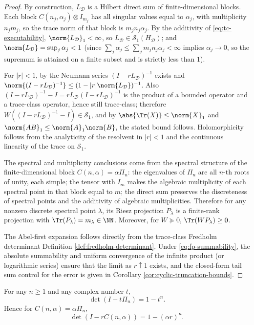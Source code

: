 \begin{proof}
By construction, \(L_{\mathcal D}\) is a Hilbert direct sum of finite-dimensional blocks.
Each block \(C(n_j,\alpha_j)\otimes I_{m_j}\) has all singular values equal to \(\alpha_j\), with multiplicity \(n_jm_j\), so the trace norm of that block is \(m_jn_j\alpha_j\).
By the additivity of \eqref{eq:tc-executability}, \(\norm{L_{\mathcal D}}_1<\infty\), so \(L_{\mathcal D}\in\mathcal{S}_1(H_{\mathcal D})\); and \(\norm{L_{\mathcal D}}=\sup_j\alpha_j<1\) (since \(\sum_j\alpha_j\le\sum_j m_jn_j\alpha_j<\infty\) implies \(\alpha_j\to 0\), so the supremum is attained on a finite subset and is strictly less than \(1\)).

For \(|r|<1\), by the Neumann series \((I-rL_{\mathcal D})^{-1}\) exists and
\(
\norm{(I-rL_{\mathcal D})^{-1}}\le (1-|r|\norm{L_{\mathcal D}})^{-1}
\).
Also \((I-rL_{\mathcal D})^{-1}-I=rL_{\mathcal D}(I-rL_{\mathcal D})^{-1}\) is the product of a bounded operator and a trace-class operator, hence still trace-class; therefore \(W((I-rL_{\mathcal D})^{-1}-I)\in\mathcal{S}_1\), and by \(\abs{\Tr(X)}\le \norm{X}_1\) and \(\norm{AB}_1\le \norm{A}_1\norm{B}\), the stated bound follows.
Holomorphicity follows from the analyticity of the resolvent in \(|r|<1\) and the continuous linearity of the trace on \(\mathcal{S}_1\).

The spectral and multiplicity conclusions come from the spectral structure of the finite-dimensional block \(C(n,\alpha)=\alpha\Pi_n\): the eigenvalues of \(\Pi_n\) are all \(n\)-th roots of unity, each simple; the tensor with \(I_{m}\) makes the algebraic multiplicity of each spectral point in that block equal to \(m\); the direct sum preserves the discreteness of spectral points and the additivity of algebraic multiplicities.
Therefore for any nonzero discrete spectral point \(\lambda\), its Riesz projection \(P_\lambda\) is a finite-rank projection with \(\Tr(P_\lambda)=m_\lambda\in\NN\).
Moreover, for \(W\succeq 0\), \(\Tr(WP_\lambda)\ge 0\).

The Abel-first expansion follows directly from the trace-class Fredholm determinant Definition \ref{def:fredholm-determinant}.
Under \eqref{eq:fp-summability}, the absolute summability and uniform convergence of the infinite product (or logarithmic series) ensure that the limit as \(r\uparrow 1\) exists, and the closed-form tail sum control for the error is given in Corollary \ref{cor:cyclic-truncation-bounds}.
\end{proof}

\begin{proposition}\label{prop:cycle-permutation-determinant}
For any \(n\ge 1\) and any complex number \(t\),
\[
\det(I-t\Pi_n)=1-t^n.
\]
Hence for \(C(n,\alpha)=\alpha\Pi_n\),
\[
\det(I-rC(n,\alpha))=1-(\alpha r)^n.
\]
\end{proposition}

